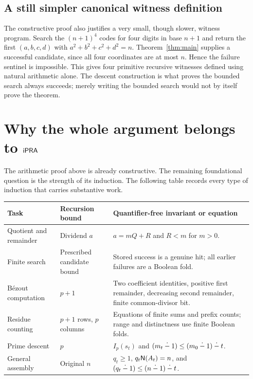 \subsection{A still simpler canonical witness definition}

The constructive proof also justifies a very small, though slower, witness
program. Search the $(n+1)^4$ codes for four digits in base $n+1$ and
return the first $(a,b,c,d)$ with $a^2+b^2+c^2+d^2=n$.
Theorem~\ref{thm:main} supplies a successful candidate, since all four
coordinates are at most $n$. Hence the failure sentinel is impossible.
This gives four primitive recursive witnesses defined using natural
arithmetic alone. The descent construction is what proves the bounded
search always succeeds; merely writing the bounded search would not by
itself prove the theorem.

\section{Why the whole argument belongs to \texorpdfstring{$\mathsf{iPRA}$}{iPRA}}
\label{sec:audit}

The arithmetic proof above is already constructive. The remaining
foundational question is the strength of its induction. The following
table records every type of induction that carries substantive work.

\begin{longtable}{@{}L{0.22\textwidth}L{0.29\textwidth}L{0.43\textwidth}@{}}
\toprule
Task & Recursion bound & Quantifier-free invariant or equation\\
\midrule
\endhead
Quotient and remainder & Dividend $a$ & $a=mQ+R$ and $R<m$ for $m>0$.\\
Finite search & Prescribed candidate bound & Stored success is a genuine hit;
all earlier failures are a Boolean fold.\\
B\'ezout computation & $p+1$ & Two coefficient identities, positive first
remainder, decreasing second remainder, finite common-divisor bit.\\
Residue counting & $p+1$ rows, $p$ columns & Equations of finite sums and
prefix counts; range and distinctness use finite Boolean folds.\\
Prime descent & $p$ & $I_p(s_t)$ and
$(m_t\mathbin{\dot{-}}1)\le(m_0\mathbin{\dot{-}}1)\mathbin{\dot{-}} t$.\\
General assembly & Original $n$ & $q_t\ge1$, $q_t\mathsf N(A_t)=n$, and
$(q_t\mathbin{\dot{-}}1)\le(n\mathbin{\dot{-}}1)\mathbin{\dot{-}} t$.\\
\bottomrule
\end{longtable}

